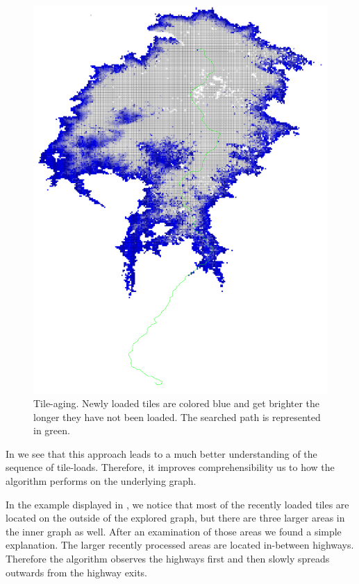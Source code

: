 \documentclass
[
    paper = a4,
    pagesize,
    12 pt,
    oneside,                       %
    open = right,
    DIV = calc,
    BCOR = 0 mm,                   %
    bibtotoc
]
{scrbook}
\begin{document}
\begin{figure}
    \includegraphics[width=\textwidth]{Images/vis-aged-coloring.png}
\caption[]{Tile-aging. Newly loaded tiles are colored blue and get brighter the longer they have not been loaded. The searched path is represented in green.}
\label{fig:color_aged_tile}
\end{figure}

In  we see that this approach leads to a much better understanding of the sequence of tile-loads.
Therefore, it improves comprehensibility us to how the algorithm performs on the underlying graph.

In the example displayed in , we notice that most of the recently loaded tiles are located on the outside of the explored graph, but there are three larger areas in the inner graph as well.
After an examination of those areas we found a simple explanation.
The larger recently processed areas are located in-between highways.
Therefore the algorithm observes the highways first and then slowly spreads outwards from the highway exits.
\end{document}
